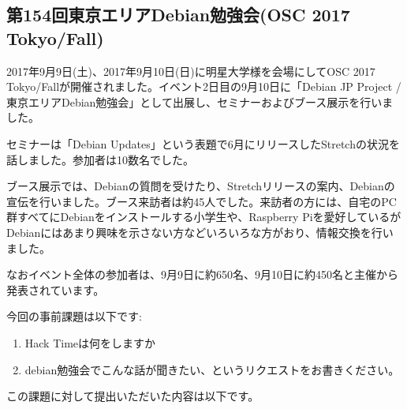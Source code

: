 \documentclass[mingoth,a4paper]{jsarticle}
\begin{document}
\subsection{第154回東京エリアDebian勉強会(OSC 2017 Tokyo/Fall)}

2017年9月9日(土)、2017年9月10日(日)に明星大学様を会場にしてOSC 2017 Tokyo/Fallが開催されました。イベント2日目の9月10日に「Debian JP Project / 東京エリアDebian勉強会」として出展し、セミナーおよびブース展示を行いました。

セミナーは「Debian Updates」という表題で6月にリリースしたStretchの状況を話しました。参加者は10数名でした。

ブース展示では、Debianの質問を受けたり、Stretchリリースの案内、Debianの宣伝を行いました。ブース来訪者は約45人でした。来訪者の方には、自宅のPC群すべてにDebianをインストールする小学生や、Raspberry Piを愛好しているがDebianにはあまり興味を示さない方などいろいろな方がおり、情報交換を行いました。

なおイベント全体の参加者は、9月9日に約650名、9月10日に約450名と主催から発表されています。



今回の事前課題は以下です:
\begin{enumerate}
\item Hack Timeは何をしますか
\item debian勉強会でこんな話が聞きたい、というリクエストをお書きください。
\end{enumerate}
この課題に対して提出いただいた内容は以下です。
\begin{multicols}{2}
{\small

}
\end{multicols}

%
%
%
%




\end{document}
